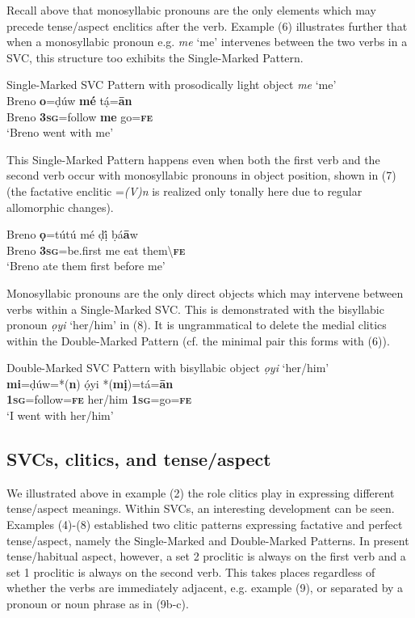 \documentclass[output=paper]{langsci/langscibook}
\begin{document}
Recall above that monosyllabic pronouns are the only elements which may precede tense/aspect enclitics after the verb. Example (6) illustrates further that when a monosyllabic pronoun e.g. \textit{me} ‘me’ intervenes between the two verbs in a SVC, this structure too exhibits the Single-Marked Pattern. 

\ea
{Single-Marked SVC Pattern with prosodically light object \textit{me} ‘me’}\\
\gll  Breno  \textbf{o}=ḍúw    \textbf{mé}  tạ́=\textbf{\={a}n}\\
     Breno   \textbf{3}\textbf{\textsc{sg}}=follow   \textbf{me}  go=\textbf{\textsc{fe}}\\
\glt ‘Breno went with me’ \citep[115]{Kari2004}
\z


This Single-Marked Pattern happens even when both the first verb and the second verb occur with monosyllabic pronouns in object position, shown in (7) (the factative enclitic =\textit{(V)n} is realized only tonally here due to regular allomorphic changes).

 \ea
\gll  Breno   \textbf{ọ}=tútú     mé   ḍị́   ḅá\textbf{\={a}}w\\
     Breno  \textbf{\textsc{3sg}}=be.first  me  eat  them{\textbackslash}\textbf{\textsc{fe}}\\
\glt ‘Breno ate them first before me’
\z

Monosyllabic pronouns are the only direct objects which may intervene between verbs within a Single-Marked SVC. This is demonstrated with the bisyllabic pronoun \textit{ọyi} ‘her/him’ in (8). It is ungrammatical to delete the medial clitics within the Double-Marked Pattern (cf. the minimal pair this forms with (6)). 

\ea
{Double-Marked SVC Pattern with bisyllabic object \textit{ọyi} ‘her/him’}\\
\gll  \textbf{mi}=ḍúw=*(\textbf{n})     ọ́yi     *(\textbf{mị})=tá=\textbf{\={a}n}\\
     \textbf{1}\textbf{\textsc{sg}}=follow=\textbf{\textsc{fe}}   her/him   \textbf{1}\textbf{\textsc{sg}}=go=\textbf{\textsc{fe}}\\
\glt ‘I went with her/him’ \citep[201]{Kari2004}
\z

\subsection{SVCs, clitics, and tense/aspect}

We illustrated above in example (2) the role clitics play in expressing different tense/aspect meanings. Within SVCs, an interesting development can be seen. Examples (4){}-(8) established two clitic patterns expressing factative and perfect tense/aspect, namely the Single-Marked and Double-Marked Patterns. In present tense/habitual aspect, however, a set 2 proclitic is always on the first verb and a set 1 proclitic is always on the second verb. This takes places regardless of whether the verbs are immediately adjacent, e.g. example (9), or separated by a pronoun or noun phrase as in (9b-c). 
\end{document}
